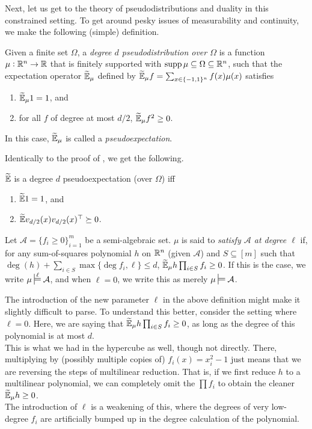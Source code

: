 Next, let us get to the theory of pseudodistributions and duality in this constrained setting. To get around pesky issues of measurability and continuity, we make the following (simple) definition.

\begin{fdef}
	Given a finite set $\Omega$, a \emph{degree $d$ pseudodistribution over $\Omega$} is a function $\mu : \mathbb{R}^n \to \mathbb{R}$ that is finitely supported with $\operatorname{supp} \mu \subseteq \Omega \subseteq \mathbb{R}^n$, such that the expectation operator $\widetilde{\mathbb{E}}_{\mu}$ defined by $\widetilde{\mathbb{E}}_{\mu} f = \sum_{x \in \{-1,1\}^n} f(x) \mu(x)$ satisfies
	\begin{enumerate}[label=(\alph*)]
		\item $\widetilde{\mathbb{E}}_\mu 1 = 1$, and
		\item for all $f$ of degree at most $d/2$, $\widetilde{\mathbb{E}}_\mu f^2 \ge 0$.
	\end{enumerate}
	In this case, $\widetilde{\mathbb{E}}_\mu$ is called a \emph{pseudoexpectation}.
\end{fdef}

Identically to the proof of , we get the following.

\begin{fprop}
	$\widetilde{\mathbb{E}}$ is a degree $d$ pseudoexpectation (over $\Omega$) iff
	\begin{enumerate}[label=(\alph*)]
		\item $\widetilde{\mathbb{E}} 1 = 1$, and
		\item $\widetilde{\mathbb{E}} v_{d/2}(x) v_{d/2}(x)^\top \succeq 0$. 
	\end{enumerate}
\end{fprop}

\begin{fdef}
	\label{def:pd-satisfy}
	Let $\mathcal{A} = \{f_i \ge 0\}_{i=1}^m$ be a semi-algebraic set. $\mu$ is said to \emph{satisfy $\mathcal{A}$ at degree $\ell$} if, for any sum-of-squares polynomial $h$ on $\mathbb{R}^n$ (given $\mathcal{A}$) and $S \subseteq [m]$ such that $\deg(h) + \sum_{i \in S} \max\{\deg f_i , \ell\} \le d$, $\widetilde{\mathbb{E}}_\mu h \prod_{i \in S} f_i \ge 0$. If this is the case, we write $\mu \sdtstile{}{\ell} \mathcal{A}$, and when $\ell = 0$, we write this as merely $\mu \sdtstile{}{} \mathcal{A}$.
\end{fdef}
The introduction of the new parameter $\ell$ in the above definition might make it slightly difficult to parse. To understand this better, consider the setting where $\ell = 0$. Here, we are saying that $\widetilde{\mathbb{E}}_\mu h \prod_{i \in S} f_i \ge 0$, as long as the degree of this polynomial is at most $d$.\\
This is what we had in the hypercube as well, though not directly. There, multiplying by (possibly multiple copies of) $f_i(x) = x_i^2 - 1$ just means that we are reversing the steps of multilinear reduction. That is, if we first reduce $h$ to a multilinear polynomial, we can completely omit the $\prod f_i$ to obtain the cleaner $\widetilde{\mathbb{E}}_\mu h \ge 0$. \\
The introduction of $\ell$ is a weakening of this, where the degrees of very low-degree $f_i$ are artificially bumped up in the degree calculation of the polynomial.\\

